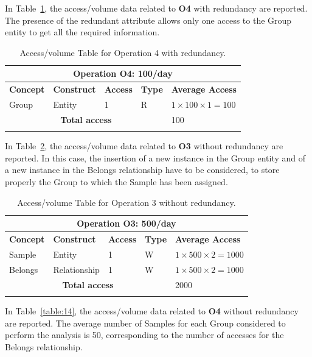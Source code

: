 In Table~\ref{table:12}, the access/volume data related to \textbf{O4} with redundancy are reported. The presence of the redundant attribute allows only one access to the Group entity to get all the required information.

\begin{longtable}{|p{}|p{}|p{}|p{}|p{}|}
\hline
\multicolumn{5}{|c|}{\textbf{Operation O4: 100/day}}\\\hline
\textbf{Concept} & \textbf{Construct} & \textbf{Access} & \textbf{Type} & \textbf{Average Access} \\
\hline
Group & Entity & 1 & R & $1 \times 100 \times 1 = 100$\\
\hline
\multicolumn{4}{|c|}{\textbf{Total access}} & 100\\
\hline
\caption{Access/volume Table for Operation 4 with redundancy.}
\label{table:12}
\end{longtable}

In Table~\ref{table:13}, the access/volume data related to \textbf{O3} without redundancy are reported. In this case, the insertion of a new instance in the Group entity and of a new instance in the Belongs relationship have to be considered, to store properly the Group to which the Sample has been assigned.

\begin{longtable}{|p{}|p{}|p{}|p{}|p{}|}
\hline
\multicolumn{5}{|c|}{\textbf{Operation O3: 500/day}}\\\hline
\textbf{Concept} & \textbf{Construct} & \textbf{Access} & \textbf{Type} & \textbf{Average Access} \\
\hline
Sample & Entity & 1 & W & $1 \times 500 \times 2 = 1000$\\
Belongs & Relationship & 1 & W & $1 \times 500 \times 2 = 1000$\\
\hline
\multicolumn{4}{|c|}{\textbf{Total access}} & 2000\\
\hline
\caption{Access/volume Table for Operation 3 without redundancy.}
\label{table:13}
\end{longtable}

In Table~\ref{table:14}, the access/volume data related to \textbf{O4} without redundancy are reported. The average number of Samples for each Group considered to perform the analysis is 50, corresponding to the number of accesses for the Belongs relationship.

